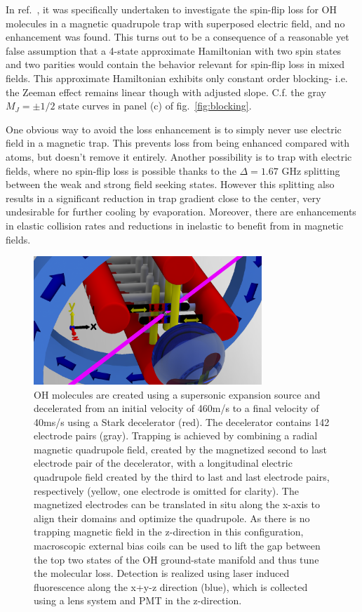 \documentclass[%
 reprint,
 amsmath,amssymb,
 aps,
prl,
]{revtex4-1}
\begin{document}
In ref.~\cite{Lara2008}, it was specifically undertaken to investigate the spin-flip loss for OH molecules in a magnetic quadrupole trap with superposed electric field, and no enhancement was found. This turns out to be a consequence of a reasonable yet false assumption that a 4-state approximate Hamiltonian with two spin states and two parities would contain the behavior relevant for spin-flip loss in mixed fields. This approximate Hamiltonian exhibits only constant order blocking- i.e. the Zeeman effect remains linear though with adjusted slope. C.f. the gray $M_J=\pm1/2$ state curves in panel (c) of fig.~\ref{fig:blocking}.



One obvious way to avoid the loss enhancement is to simply never use electric field in a magnetic trap. This prevents loss from being enhanced compared with atoms, but doesn't remove it entirely. Another possibility is to trap with electric fields, where no spin-flip loss is possible thanks to the $\Delta=1.67\text{ GHz}$ splitting between the weak and strong field seeking states. However this splitting also results in a significant reduction in trap gradient close to the center, very undesirable for further cooling by evaporation. Moreover, there are enhancements in elastic collision rates and reductions in inelastic to benefit from in magnetic fields. \cite{stuhl2012evap}

\begin{figure}
\includegraphics[width=86mm]{CAD_recolor_laser.PNG}%
\caption{
OH molecules are created using a supersonic expansion source and decelerated from an initial velocity of 460m/s to a final velocity of 40ms/s using a Stark decelerator (red). The decelerator contains 142 electrode pairs (gray). Trapping is achieved by combining a radial magnetic quadrupole field, created by the magnetized second to last electrode pair of the decelerator, with a longitudinal electric quadrupole field created by the third to last and last electrode pairs, respectively (yellow, one electrode is omitted for clarity). The magnetized electrodes can be translated in situ along the x-axis to align their domains and optimize the quadrupole. As there is no trapping magnetic field in the z-direction in this configuration, macroscopic external bias coils can be used to lift the gap between the top two states of the OH ground-state manifold and thus tune the molecular loss. Detection is realized using laser induced fluorescence along the x+y-z direction (blue), which is collected using a lens system and PMT in the z-direction.
\label{fig:CAD}}
\end{figure}
\end{document}
